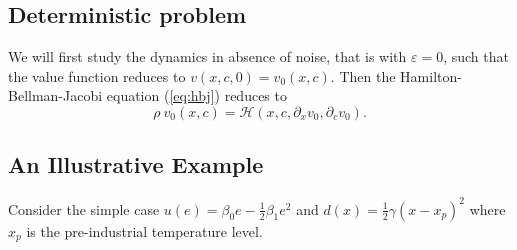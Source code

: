\documentclass[../../main.tex]{subfiles}
\begin{document}
\subsection{Deterministic problem}

We will first study the dynamics in absence of noise, that is with $\varepsilon = 0$, such that the value function reduces to $v(x, c, 0) = v_0(x, c)$. Then the Hamilton-Bellman-Jacobi equation (\ref{eq:hbj}) reduces to \begin{equation}
    \rho \ v_0(x, c) = \mathcal{H}(x, c, \partial_x v_0, \partial_c v_0).
\end{equation}

\subsection{An Illustrative Example}

Consider the simple case $u(e) = \beta_0 e - \frac{1}{2} \beta_1 e^2$ and $d(x) = \frac{1}{2}\gamma (x - x_p)^2$ where $x_p$ is the pre-industrial temperature level.
\end{document}
